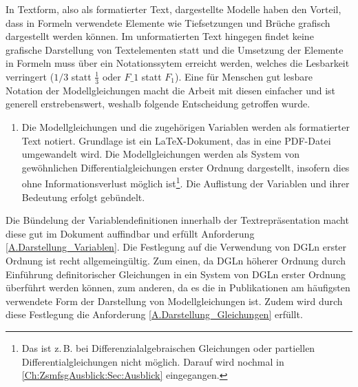 In Textform, also als formatierter Text, dargestellte Modelle haben den Vorteil, dass in Formeln verwendete Elemente wie Tiefsetzungen und Brüche grafisch dargestellt werden können. Im unformatierten Text hingegen findet keine grafische Darstellung von Textelementen statt und die Umsetzung der Elemente in Formeln muss über ein Notationssytem erreicht werden, welches die Lesbarkeit verringert ($1/3$ statt $\frac{1}{3}$ oder $F\_1$ statt $F_1$). Eine für Menschen gut lesbare Notation der Modellgleichungen macht die Arbeit mit diesen einfacher und ist generell erstrebenswert, weshalb folgende Entscheidung getroffen wurde. 
\begin{enumerate}[resume*]
	\item \label{E.Textdok}Die Modellgleichungen und die zugehörigen Variablen werden als formatierter Text notiert. Grundlage ist ein \LaTeX-Dokument, das in eine PDF-Datei umgewandelt wird. Die Modellgleichungen werden als System von gewöhnlichen Differentialgleichungen erster Ordnung dargestellt, insofern dies ohne Informationsverlust möglich ist\footnote{Das ist z.\,B. bei Differenzialalgebraischen Gleichungen oder partiellen Differentialgleichungen nicht möglich. Darauf wird nochmal in \autoref{Ch:ZsmfsgAusblick:Sec:Ausblick} eingegangen.}. Die Auflistung der Variablen und ihrer Bedeutung erfolgt gebündelt.
\end{enumerate}
Die Bündelung der Variablendefinitionen innerhalb der Textrepräsentation macht diese gut im Dokument auffindbar und erfüllt Anforderung \ref{A.Darstellung_Variablen}. Die Festlegung auf die Verwendung von DGLn erster Ordnung ist recht allgemeingültig. Zum einen, da DGLn höherer Ordnung durch Einführung definitorischer Gleichungen in ein System von DGLn erster Ordnung überführt werden können, zum anderen, da es die in Publikationen am häufigsten verwendete Form der Darstellung von Modellgleichungen ist. Zudem wird durch diese Festlegung die Anforderung \ref{A.Darstellung_Gleichungen} erfüllt.

